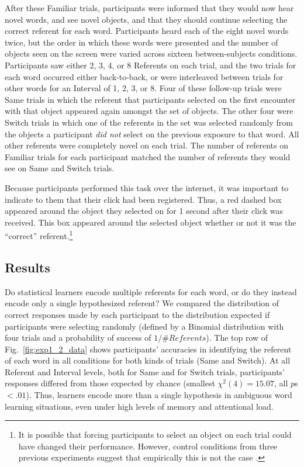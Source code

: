 \documentclass[man,floatsintext]{apa6}
\begin{document}
After these Familiar trials, participants were informed that they would now hear novel words, and see novel objects, and that they should continue selecting the correct referent for each word. Participants heard each of the eight novel words twice, but the order in which these words were presented and the number of objects seen on the screen were varied across sixteen between-subjects conditions. Participants saw either 2, 3, 4, or 8 Referents on each trial, and the two trials for each word occurred either back-to-back, or were interleaved between trials for other words for an Interval of 1, 2, 3, or 8. Four of these follow-up trials were Same trials in which the referent that participants selected on the first encounter with that object appeared again amongst the set of objects. The other four were Switch trials in which one of the referents in the set was selected randomly from the objects a participant \emph{did not} select on the previous exposure to that word. All other referents were completely novel on each trial. The number of referents on Familiar trials for each participant matched the number of referents they would see on Same and Switch trials.

Because participants performed this task over the internet, it was important to indicate to them that their click had been registered. Thus, a red dashed box appeared around the object they selected on for 1 second after their click was received. This box appeared around the selected object whether or not it was the ``correct'' referent.\footnote{It is possible that forcing participants to select an object on each trial could have changed their performance. However, control conditions from three previous experiments suggest that empirically this is not the case \cite{Medina2011, Smith2011a, Trueswell2013}.}

\subsection{Results}

Do statistical learners encode multiple referents for each word, or do they instead encode only a single hypothesized referent? We compared the distribution of correct responses made by each participant to the distribution expected if participants were selecting randomly (defined by a Binomial distribution with four trials and a probability of success of  $1/\# Referents$). The top row of Fig.~\ref{fig:exp1_2_data} shows participants' accuracies in identifying the referent of each word in all conditions for both kinds of trials (Same and Switch). At all Referent and Interval levels, both for Same and for Switch trials, participants' responses differed from those expected by chance (smallest $\chi^{2}(4) = 15.07$, all $p$s $< .01$). Thus, learners encode more than a single hypothesis in ambiguous word learning situations, even under high levels of memory and attentional load. 
\end{document}
